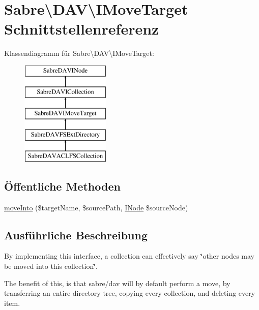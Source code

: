 \hypertarget{interface_sabre_1_1_d_a_v_1_1_i_move_target}{}\section{Sabre\textbackslash{}D\+AV\textbackslash{}I\+Move\+Target Schnittstellenreferenz}
\label{interface_sabre_1_1_d_a_v_1_1_i_move_target}
Klassendiagramm für Sabre\textbackslash{}D\+AV\textbackslash{}I\+Move\+Target\+:\begin{figure}[H]
\begin{center}
\leavevmode
\includegraphics[height=5.000000cm]{interface_sabre_1_1_d_a_v_1_1_i_move_target}
\end{center}
\end{figure}
\subsection*{Öffentliche Methoden}
\begin{DoxyCompactItemize}
\item 
\mbox{\hyperlink{interface_sabre_1_1_d_a_v_1_1_i_move_target_a65380c5b58a8a78bb4c9135567a50cdb}{move\+Into}} (\$target\+Name, \$source\+Path, \mbox{\hyperlink{interface_sabre_1_1_d_a_v_1_1_i_node}{I\+Node}} \$source\+Node)
\end{DoxyCompactItemize}


\subsection{Ausführliche Beschreibung}
By implementing this interface, a collection can effectively say \char`\"{}other
nodes may be moved into this collection\char`\"{}.

The benefit of this, is that sabre/dav will by default perform a move, by transferring an entire directory tree, copying every collection, and deleting every item.

